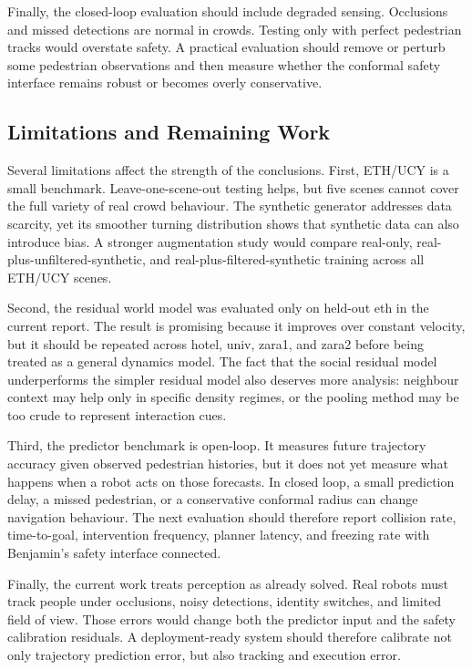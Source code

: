 \documentclass[conference]{IEEEtran}
\begin{document}
Finally, the closed-loop evaluation should include degraded sensing. Occlusions
and missed detections are normal in crowds. Testing only with perfect
pedestrian tracks would overstate safety. A practical evaluation should remove
or perturb some pedestrian observations and then measure whether the conformal
safety interface remains robust or becomes overly conservative.

\subsection{Limitations and Remaining Work}

Several limitations affect the strength of the conclusions. First, ETH/UCY is a
small benchmark. Leave-one-scene-out testing helps, but five scenes cannot cover
the full variety of real crowd behaviour. The synthetic generator addresses
data scarcity, yet its smoother turning distribution shows that synthetic data
can also introduce bias. A stronger augmentation study would compare real-only,
real-plus-unfiltered-synthetic, and real-plus-filtered-synthetic training across
all ETH/UCY scenes.

Second, the residual world model was evaluated only on held-out eth in the
current report. The result is promising because it improves over constant
velocity, but it should be repeated across hotel, univ, zara1, and zara2 before
being treated as a general dynamics model. The fact that the social residual
model underperforms the simpler residual model also deserves more analysis:
neighbour context may help only in specific density regimes, or the pooling
method may be too crude to represent interaction cues.

Third, the predictor benchmark is open-loop. It measures future trajectory
accuracy given observed pedestrian histories, but it does not yet measure what
happens when a robot acts on those forecasts. In closed loop, a small prediction
delay, a missed pedestrian, or a conservative conformal radius can change
navigation behaviour. The next evaluation should therefore report collision
rate, time-to-goal, intervention frequency, planner latency, and freezing rate
with Benjamin's safety interface connected.

Finally, the current work treats perception as already solved. Real robots must
track people under occlusions, noisy detections, identity switches, and limited
field of view. Those errors would change both the predictor input and the
safety calibration residuals. A deployment-ready system should therefore
calibrate not only trajectory prediction error, but also tracking and execution
error.
\end{document}
